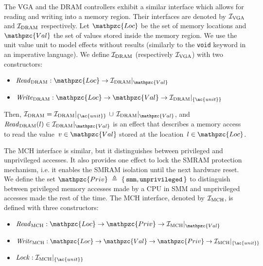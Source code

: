 \begin{example}
  The VGA and the DRAM controllers exhibit a similar interface which allows for
  reading and writing into a memory region.
  Their interfaces are denoted by $\mathcal{I}_{\mathrm{VGA}}$ and $\mathcal{I}_{\mathrm{DRAM}}$
  respectively.
  Let $\mathpzc{Loc}$ be the set of memory locations and $\mathpzc{Val}$ the set
  of values stored inside the memory region.
  We use the unit value \ac{unit} to model effects without results (similarly to
  the \texttt{void} keyword in an imperative language).
  We define $\mathcal{I}_{\mathrm{DRAM}}$ (respectively $\mathcal{I}_{\mathrm{VGA}}$) with two
  constructors:
  \begin{itemize}
  \item
    $\func{Read}_{\mathrm{DRAM}} : \mathpzc{Loc} \rightarrow
    \Interface{\I_{\mathrm{DRAM}}}{\mathpzc{Val}}$
  \item
    $\func{Write}_{\mathrm{DRAM}} : \mathpzc{Loc} \rightarrow \mathpzc{Val}
    \rightarrow \Interface{\I_{\mathrm{DRAM}}}{\{\ac{unit}\}}$
  \end{itemize}

  Then,
  $\I_{\mathrm{DRAM}} =
  \Interface{\I_{\mathrm{DRAM}}}{\{\ac{unit}\}}\,\cup\,\Interface{\I_{\mathrm{DRAM}}}{\mathpzc{Val}}$,
  and
  $\func{Read}_{\mathrm{DRAM}}(l) \in
  \Interface{\I_{\mathrm{DRAM}}}{\mathpzc{Val}}$ is an effect that describes a
  memory access to read the value~$v \in \mathpzc{Val}$ stored at the
  location~$l \in \mathpzc{Loc}$.

  The MCH interface is similar, but it distinguishes between privileged and
  unprivileged accesses.
  It also provides one effect to lock the SMRAM protection mechanism, i.e. it
  enables the SMRAM isolation until the next hardware reset.
  We define the set
  $\mathpzc{Priv}~\triangleq~\{\,\val{smm}, \val{unprivileged}\,\}$ to
  distinguish between privileged memory accesses made by a CPU in SMM and
  unprivileged accesses made the rest of the time.
  The MCH interface, denoted by $\mathcal{I}_{\mathrm{MCH}}$, is defined with three
  constructors:
  \begin{itemize}
  \item
    $\func{Read}_{\mathrm{MCH}} : \mathpzc{Loc} \rightarrow \mathpzc{Priv}
    \rightarrow \Interface{\I_{\mathrm{MCH}}}{\mathpzc{Val}}$
  \item
    $\func{Write}_{\mathrm{MCH}} : \mathpzc{Loc} \rightarrow \mathpzc{Val}
    \rightarrow \mathpzc{Priv} \rightarrow
    \Interface{\I_{\mathrm{MCH}}}{\{\ac{unit}\}}$
  \item $\func{Lock} : \Interface{\I_{\mathrm{MCH}}}{\{\ac{unit}\}}$
  \end{itemize}
\end{example}

